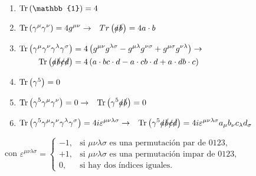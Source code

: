 \begin{enumerate}
\item $\Tr\left(\mathbb{1}\right)=4$
\item $\begin{aligned}[t]
\operatorname{Tr}\left( \gamma ^{\mu }\gamma ^{\nu }\right)&=4g^{\mu \nu }\rightarrow & Tr\left(\slashed{a}\slashed{b}\right) &=4a\cdot b
\end{aligned}$
\item $\begin{aligned}[t]
\operatorname{Tr}\left( \gamma ^{\mu }\gamma ^{\nu }\gamma ^{\lambda }\gamma ^{\sigma }\right)&= 4\left( g^{\mu\nu}g^{\lambda \sigma} -g^{\mu \lambda }g^{\nu \sigma }+g^{\mu \sigma }g^{\nu \lambda }\right) \rightarrow \\ \operatorname{Tr}\left(\slashed{a}\slashed{b}\slashed{c}\slashed{d}\right) &=4\left( a\cdot bc\cdot d-a\cdot cb\cdot d+a\cdot db\cdot c\right)
\end{aligned}$
\item $\operatorname{Tr}\left( \gamma ^{5}\right)=0$
\item $\begin{aligned}[t]
\operatorname{Tr}\left( \gamma ^{5}\gamma ^{\mu }\gamma ^{\nu }\right)&=0 \rightarrow & \operatorname{Tr}\left(\gamma ^{5}\slashed{a}\slashed{b}\right) &=0 
\end{aligned}$
\item $\begin{aligned}[t]
\operatorname{Tr}\left( \gamma ^{5}\gamma ^{\mu }\gamma ^{\nu }\gamma ^{\lambda }\gamma ^{\sigma }\right)&=4i\varepsilon ^{\mu \nu \lambda \sigma } \rightarrow & \operatorname{Tr}\left(\gamma ^{5}\slashed{a}\slashed{b}\slashed{c}\slashed{d}\right) &=4i\varepsilon ^{\mu \nu \lambda \sigma }a_{\mu }b_{\nu }c_{\lambda }d_{\sigma } 
\end{aligned}$
\end{enumerate}

con $\varepsilon^{\mu\nu\lambda\sigma} = \left\{\begin{array}{lr}
        -1, & \text{si $\mu\nu\lambda\sigma$ es una permutación par de 0123},\\
        +1, & \text{si $\mu\nu\lambda\sigma$ es una permutación impar de 0123},\\
        0, & \text{si hay dos índices iguales}.
        \end{array}\right. $
